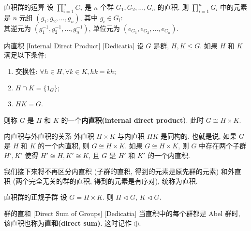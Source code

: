         \begin{ppt}
            {直积群的运算}
            设 \(\prod\limits_{i=1}^n G_i\) 是 \(n\) 个群 \(G_1, G_2, \ldots, G_n\) 的直积. 则 \(\prod\limits_{i=1}^n G_i\) 中的元素是 \(n\) 元组 \((g_1, g_2, \ldots, g_n)\), 其中 \(g_i\in G_i\):\\
            其逆元为 \((g_1^{-1}, g_2^{-1}, \ldots, g_n^{-1})\), 单位元为 \((e_{G_1}, e_{G_2}, \ldots, e_{G_n})\).
        \end{ppt}

        \begin{thm}
            {内直积}
            [Internal Direct Product]
            [Dedicatia]
            设 \(G\) 是群, \(H,K\leq G\). 如果 \(H\) 和 \(K\) 满足以下条件:
            \begin{enumerate}[label=(\roman*)]
                \item 交换性: \(\forall h\in H, \forall k\in K, hk=kh\);
                \item \(H\cap K=\{1_G\}\);
                \item \(HK=G\).
            \end{enumerate}
            则称 \(G\) 是 \(H\) 和 \(K\) 的一个\textbf{内直积(internal direct product)}. 此时 \(G\cong H\times K\).
        \end{thm}

        \begin{thm}
            {内直积与外直积的关系}
            外直积 \(H\times K\) 与内直积 \(HK\) 是同构的. 也就是说, 如果 \(G\) 是 \(H\) 和 \(K\) 的一个内直积, 则 \(G\cong H\times K\). 如果 \(G\cong H\times K\), 则 \(G\) 中存在两个子群 \(H', K'\) 使得 \(H'\cong H, K'\cong K\), 且 \(G\) 是 \(H'\) 和 \(K'\) 的一个内直积.
        \end{thm}

        \begin{rmk}
            我们接下来将不再区分内直积 (子群的直积, 得到的元素是原先群的元素) 和外直积 (两个完全无关的群的直积, 得到的元素是有序对), 统称为直积.
        \end{rmk}

        \begin{ppt}
            {直积群的正规子群}
            设 \(G=H\times K\). 则 \(H\lhd G\), \(K\lhd G\).
        \end{ppt}

        \begin{dfn}
            {群的直和}
            [Direct Sum of Groups]
            [Dedicatia]
            当直积中的每个群都是 Abel 群时, 该直积也称为\textbf{直和(direct sum)}. 这时记作 \(\oplus\).
        \end{dfn}

